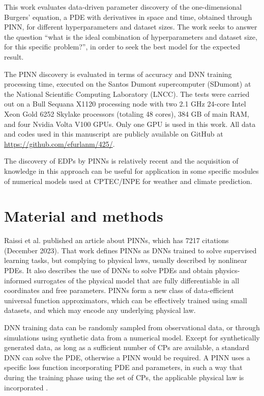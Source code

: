 \documentclass[conference]{IEEEtran}
\begin{document}
This work evaluates data-driven parameter discovery of the one-dimensional Burgers' equation, a PDE with derivatives in space and time, obtained through PINN, for different hyperparameters and dataset sizes.
The work seeks to answer the question “what is the ideal combination of hyperparameters and dataset size, for this specific problem?”, in order to seek the best model for the expected result.

The PINN discovery is evaluated in terms of accuracy and DNN training processing time, executed on the Santos Dumont supercomputer (SDumont) at the National Scientific Computing Laboratory (LNCC). The tests were carried out on a Bull Sequana X1120 processing node with two 2.1 GHz 24-core Intel Xeon Gold 6252 Skylake processors (totaling 48 cores), 384 GB of main RAM, and four Nvidia Volta V100 GPUs. Only one GPU is used in this work. All data and codes used in this manuscript are publicly available on GitHub at \url{https://github.com/efurlanm/425/}.

The discovery of EDPs by PINNs is relatively recent and the acquisition of knowledge in this approach can be useful for application in some specific modules of numerical models used at CPTEC/INPE for weather and climate prediction. 

\section{Material and methods}\label{sec:meth}

Raissi et al. \cite{Raissi2019} published an article about PINNs, which has 7217 citations (December 2023). That work defines PINNs as DNNs trained to solve supervised learning tasks, but complying to physical laws, usually described by nonlinear PDEs. It also describes the use of DNNs to solve PDEs and obtain physics-informed surrogates of the physical model that are fully differentiable in all coordinates and free parameters. PINNs form a new class of data-efficient universal function approximators, which can be effectively trained using small datasets, and which may encode any underlying physical law. 

DNN training data can be randomly sampled from observational data, or through simulations using synthetic data from a numerical model. Except for synthetically generated data, as long as a sufficient number of CPs are available, a standard DNN can solve the PDE, otherwise a PINN would be required. A PINN uses a specific loss function incorporating PDE and parameters, in such a way that during the training phase using the set of CPs, the applicable physical law is incorporated \cite{Cuomo2022}.
\end{document}
